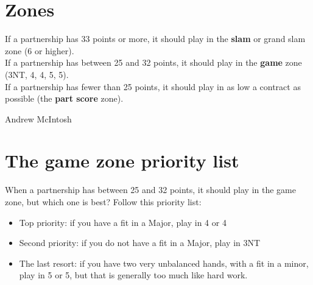 \documentclass[14pt]{extarticle}
\begin{document}
\newpage
\addtocounter{page}{3}
\vspace*{\fill}
\begingroup
\centering
\section*{Zones}
\endgroup

\noindent If a partnership has 33 points or more, it should play in the \textbf{slam} or grand slam zone (6\textcolor{ForestGreen}{} or higher).\\

\noindent If a partnership has between 25 and 32 points, it should play in the \textbf{game} zone (3NT, 4\textcolor{red}{}, 4\textcolor{blue}{}, 5\textcolor{ForestGreen}{}, 5\textcolor{orange}{}).\\

\noindent If a partnership has fewer than 25 points, it should play in as low a contract as possible (the \textbf{part score} zone).\\

\vspace*{\fill}
\begin{flushbottom}
 \begin{center}
 \tiny
 \textcopyright Andrew McIntosh
\end{center}
\end{flushbottom}







\newpage
\vspace*{\fill}
\begingroup
\centering

\section*{The game zone priority list}
\endgroup
\noindent When a partnership has between 25 and 32 points, it should play in the game zone, but which one is best? Follow this priority list:\\

\begin{itemize}
 \item Top priority: if you have a fit in a Major, play in 4\textcolor{red}{} or 4\textcolor{blue}{}
\item Second priority: if you do not have a fit in a Major, play in 3NT
\item The last resort: if you have two very unbalanced hands, with a fit in a minor, play in 5\textcolor{ForestGreen}{} or 5\textcolor{orange}{}, but that is generally too much like hard work.
\end{itemize}
\end{document}
